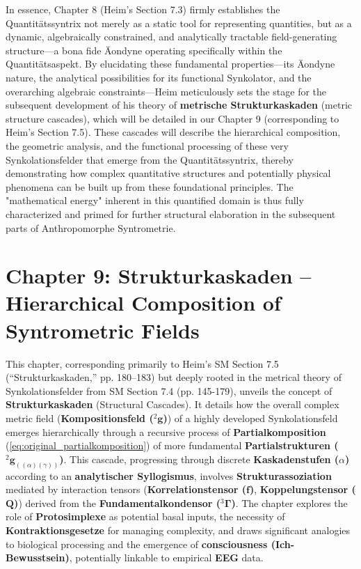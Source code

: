 \documentclass[12pt]{article}
\newcommand{\q}[1]{\enquote{#1}}
\newcommand{\kompositionsfeld}{{}^2\mathbf{g}}
\newcommand{\partialstruktur}[1]{{}^2\mathbf{g}_{(#1)}} %
\newcommand{\fundamentalkondensor}{{}^3\bm{\Gamma}}
\newcommand{\korrelationstensor}{\mathbf{f}}
\newcommand{\koppelungstensor}{\mathbf{Q}}
\newcommand{\kaskadenstufe}{\alpha}
\begin{document}
In essence, Chapter 8 (Heim's Section 7.3) firmly establishes the Quantitätssyntrix not merely as a static tool for representing quantities, but as a dynamic, algebraically constrained, and analytically tractable field-generating structure—a bona fide Äondyne operating specifically within the Quantitätsaspekt. By elucidating these fundamental properties—its Äondyne nature, the analytical possibilities for its functional Synkolator, and the overarching algebraic constraints—Heim meticulously sets the stage for the subsequent development of his theory of \textbf{metrische Strukturkaskaden} (metric structure cascades), which will be detailed in our Chapter 9 (corresponding to Heim's Section 7.5). These cascades will describe the hierarchical composition, the geometric analysis, and the functional processing of these very Synkolationsfelder that emerge from the Quantitätssyntrix, thereby demonstrating how complex quantitative structures and potentially physical phenomena can be built up from these foundational principles. The "mathematical energy" inherent in this quantified domain is thus fully characterized and primed for further structural elaboration in the subsequent parts of Anthropomorphe Syntrometrie.

\clearpage 
\section{Chapter 9: Strukturkaskaden – Hierarchical Composition of Syntrometric Fields}
\label{sec:chapter9}

This chapter, corresponding primarily to Heim's SM Section 7.5 (\q{Strukturkaskaden,} pp. 180–183) but deeply rooted in the metrical theory of Synkolationsfelder from SM Section 7.4 (pp. 145-179), unveils the concept of \textbf{Strukturkaskaden} (Structural Cascades). It details how the overall complex metric field (\textbf{Kompositionsfeld (\(\kompositionsfeld\))}) of a highly developed Synkolationsfeld emerges hierarchically through a recursive process of \textbf{Partialkomposition} (\eqref{eq:original_partialkomposition}) of more fundamental \textbf{Partialstrukturen (\(\partialstruktur{(\alpha)(\gamma)}\))}. This cascade, progressing through discrete \textbf{Kaskadenstufen (\(\kaskadenstufe\))} according to an \textbf{analytischer Syllogismus}, involves \textbf{Strukturassoziation} mediated by interaction tensors (\textbf{Korrelationstensor (\(\korrelationstensor\))}, \textbf{Koppelungstensor (\(\koppelungstensor\))}) derived from the \textbf{Fundamentalkondensor (\(\fundamentalkondensor\))}. The chapter explores the role of \textbf{Protosimplexe} as potential basal inputs, the necessity of \textbf{Kontraktionsgesetze} for managing complexity, and draws significant analogies to biological processing and the emergence of \textbf{consciousness (Ich-Bewusstsein)}, potentially linkable to empirical \textbf{EEG} data.
\end{document}
